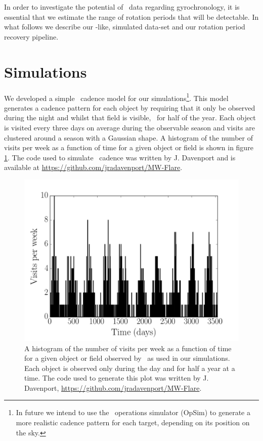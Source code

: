 In order to investigate the potential of \LSST\ data regarding gyrochronology,
it is essential that we estimate the range of rotation periods that will be
detectable.
In what follows we describe our \LSST-like, simulated data-set and our
rotation period recovery pipeline.

\section{Simulations}
We developed a simple \LSST\ cadence model for our simulations\footnote{In
future we intend to use the \LSST\ operations simulator (OpSim) to generate a
more realistic cadence pattern for each target, depending on its position on
the sky.}.
This model generates a cadence pattern for each object by requiring that it
only be observed during the night and whilst that field is visible, \ie\ for
half of the year.
Each object is visited every three days on average during the observable
season and visits are clustered around a season with a Gaussian shape.
A histogram of the number of visits per week as a function of time for a given
object or field is shown in figure \ref{fig:cadence_hist}.
The code used to simulate \LSST\ cadence was written by J. Davenport and is
available at \url{https://github.com/jradavenport/MW-Flare}.

\begin{figure}
\begin{center}
\includegraphics[width=6in, clip=true]{figures/cadence_hist}
\caption[An \LSST\ cadence histogram.]
{A histogram of the number of visits per week as a function of time
for a given object or field observed by \LSST\ as used in our simulations.
Each object is observed only during the day and for half a year at a time.
The code used to generate this plot was written by J. Davenport,
\url{https://github.com/jradavenport/MW-Flare}.}
\label{fig:cadence_hist}
\end{center}
\end{figure}

